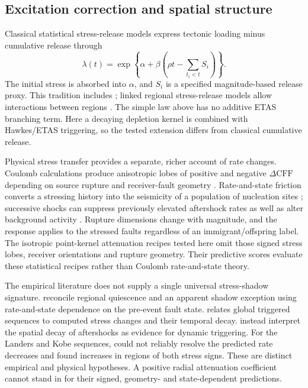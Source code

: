\subsection{Excitation correction and spatial structure}

Classical statistical stress-release models express tectonic loading minus
cumulative release through
\[
 \lambda(t)=\exp\!\left\{\alpha+\beta\left(\rho t-
                   \sum_{t_i<t}S_i\right)\right\}.
\]
The initial stress is absorbed into $\alpha$, and $S_i$ is a specified
magnitude-based release proxy. This tradition includes
\citet{VereJones1978,VereJones1988,ZhengVereJones1991,ZhengVereJones1994};
linked regional stress-release models allow interactions between regions
\citep{BebbingtonHarte2003}. The simple law above has no additive ETAS
branching term. Here a decaying depletion kernel is combined with Hawkes/ETAS
triggering, so the tested extension differs from classical cumulative release.

Physical stress transfer provides a separate, richer account of rate changes.
Coulomb calculations produce anisotropic lobes of positive and negative
$\Delta\mathrm{CFF}$ depending on source rupture and receiver-fault geometry
\citep{KingSteinLin1994,Stein1999}. Rate-and-state friction converts a
stressing history into the seismicity of a population of nucleation sites
\citep{Dieterich1994}; successive shocks can suppress previously elevated
aftershock rates as well as alter background activity \citep{TodaEtAl2005}.
Rupture dimensions change with magnitude, and the response applies to the
stressed faults regardless of an immigrant/offspring label. The isotropic
point-kernel attenuation recipes tested here omit those signed stress lobes,
receiver orientations and rupture geometry. Their predictive scores evaluate
these statistical recipes rather than Coulomb rate-and-state theory.

The empirical literature does not supply a single universal stress-shadow
signature. \citet{HarrisSimpson1998} reconcile regional quiescence and an
apparent shadow exception using rate-and-state dependence on the pre-event
fault state. \citet{Parsons2002} relates global triggered sequences to computed
stress changes and their temporal decay. \citet{FelzerBrodsky2006} instead
interpret the spatial decay of aftershocks as evidence for dynamic triggering.
For the Landers and Kobe sequences, \citet{MallmanZoback2007} could not reliably
resolve the predicted rate decreases and found increases in regions of both
stress signs. These are distinct empirical and physical hypotheses. A positive
radial attenuation coefficient cannot stand in for their signed, geometry- and
state-dependent predictions.

